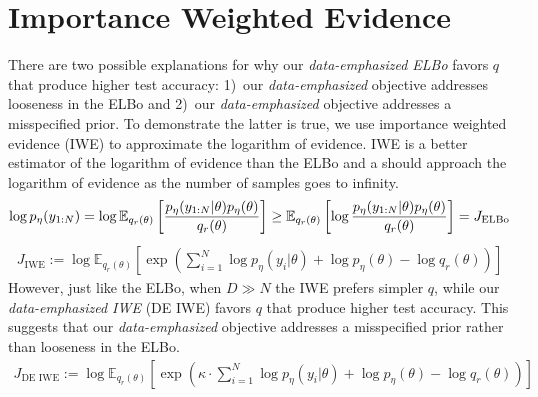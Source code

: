 \section{Importance Weighted Evidence}
\label{sec:importance_weighted_evidence}

There are two possible explanations for why our \emph{data-emphasized ELBo} favors $q$ that produce higher test accuracy: 1)~our \emph{data-emphasized} objective addresses looseness in the ELBo and 2)~our \emph{data-emphasized} objective addresses a misspecified prior.
To demonstrate the latter is true, we use importance weighted evidence (IWE) \citep{burda2016importance} to approximate the logarithm of evidence.
IWE is a better estimator of the logarithm of evidence than the ELBo and a should approach the logarithm of evidence as the number of samples goes to infinity.
\begin{align}
    \log p_{\eta}(y_{1:N}) = \log \mathbb{E}_{q_{r}(\theta)} \left[ \frac{p_{\eta}(y_{1:N} | \theta) p_{\eta}(\theta)}{q_{r}(\theta)} \right] \geq \mathbb{E}_{q_{r}(\theta)} \left[ \log \frac{p_{\eta}(y_{1:N} | \theta) p_{\eta}(\theta)}{q_{r}(\theta)} \right] = J_{\text{ELBo}}
\end{align}
\begin{align}
    J_{\text{IWE}} := \log \mathbb{E}_{q_{r}(\theta)} \left[ \exp \left( \sum_{i=1}^{N} \log p_{\eta}(y_i | \theta) + \log p_{\eta}(\theta) - \log q_{r}(\theta) \right) \right]
\end{align}
However, just like the ELBo, when $D \gg N$ the IWE prefers simpler $q$, while our \emph{data-emphasized IWE} (DE IWE) favors $q$ that produce higher test accuracy.
This suggests that our \emph{data-emphasized} objective addresses a misspecified prior rather than looseness in the ELBo.
\begin{align}
    J_{\text{DE IWE}} := \log \mathbb{E}_{q_{r}(\theta)} \left[ \exp \left( \kappa \cdot \sum_{i=1}^{N} \log p_{\eta}(y_i | \theta) + \log p_{\eta}(\theta) - \log q_{r}(\theta) \right) \right]
\end{align}


